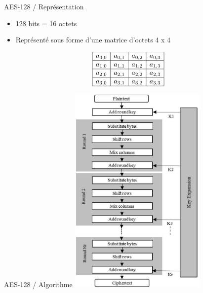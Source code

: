 \documentclass{beamer}
\begin{document}
\def\TABgen#1{
  \begin{array}{|c|c|c|c|} \hline
  #1_{0,0} & #1_{0,1} & #1_{0,2} & #1_{0,3} \\ \hline
  #1_{1,0} & #1_{1,1} & #1_{1,2} & #1_{1,3} \\ \hline
  #1_{2,0} & #1_{2,1} & #1_{2,2} & #1_{2,3} \\ \hline
  #1_{3,0} & #1_{3,1} & #1_{3,2} & #1_{3,3} \\ \hline
  \end{array}
}

\begin{frame}{AES-128 / Représentation}
    \begin{itemize}
    \item 128 bits = 16 octets
    \item Représenté sous forme d'une matrice d'octets 4 x 4
\end{itemize}
    \vspace{0.5 cm}
    \centering 
    $$ \TABgen{a} $$
\end{frame}

\begin{frame}{AES-128 / Algorithme}
\centering
    \includegraphics[width=0.5\textwidth]{images/Advanced-Encryption-Standard-AES-Algorithm.jpg}
\end{frame}
\end{document}
